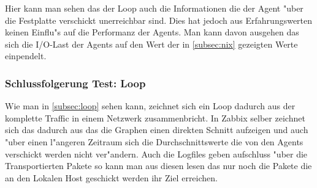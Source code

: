Hier kann man sehen das der Loop auch die Informationen die der Agent "uber die Festplatte verschickt unerreichbar sind. Dies hat jedoch aus Erfahrungswerten keinen Einflu"s auf die %
Performanz der Agents. Man kann davon ausgehen das sich die I/O-Last der Agents auf den Wert der in \cref{subsec:nix} gezeigten Werte einpendelt. %


\subsubsection{Schlussfolgerung Test: Loop}
\label{subsubsec:schlussfolgerung:loop}

Wie man in \cref{subsec:loop} sehen kann, zeichnet sich ein Loop dadurch aus der komplette Traffic in einem Netzwerk zusammenbricht. In Zabbix selber zeichnet sich das %
dadurch aus das die Graphen einen direkten Schnitt aufzeigen und auch "uber einen l"angeren Zeitraum sich die Durchschnittswerte die von den Agents verschickt werden nicht %
ver"andern. Auch die Logfiles geben aufschluss "uber die Transportierten Pakete so kann man aus diesen lesen das nur noch die Pakete die an den Lokalen Host geschickt werden %
ihr Ziel erreichen.  



